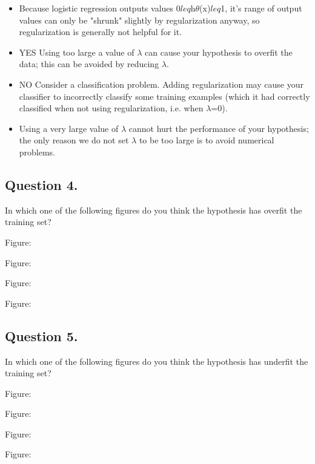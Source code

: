 	
	\begin{itemize}
		\item Because logistic regression outputs values 0$leq$h$\theta$(x)$leq$1, it's range of output values can only be "shrunk" slightly by regularization anyway, so regularization is generally not helpful for it.
		
		\item YES Using too large a value of $\lambda$ can cause your hypothesis to overfit the data; this can be avoided by reducing $\lambda$.
		\item 
		NO Consider a classification problem. Adding regularization may cause your classifier to incorrectly classify some training examples (which it had correctly classified when not using regularization, i.e. when $\lambda$=0).
		\item 
		Using a very large value of $\lambda$ cannot hurt the performance of your hypothesis; the only reason we do not set $\lambda$ to be too large is to avoid numerical problems.
	\end{itemize}
	\subsection{Question 4. }
	In which one of the following figures do you think the hypothesis has overfit the training set?
	
	Figure:
	
	
	
	Figure:
	
	
	
	Figure:
	
	
	
	Figure:
	
	
	\subsection{Question 5. } 
	In which one of the following figures do you think the hypothesis has underfit the training set?
	
	Figure:
	
	
	
	Figure:
	
	
	
	Figure:
	
	
	
	Figure:
	
